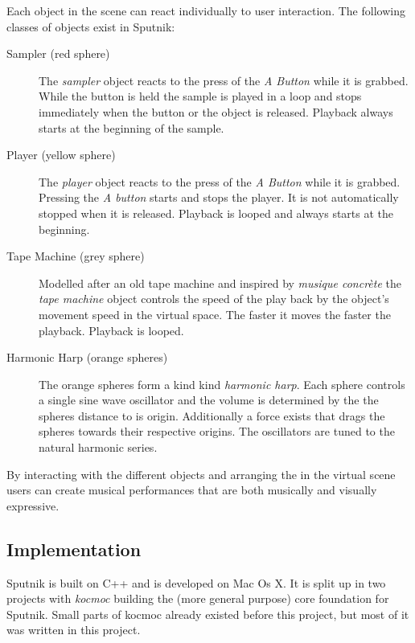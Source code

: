 \documentclass[10pt,a4paper]{scrartcl}
\begin{document}
Each object in the scene can react individually to user interaction. The following classes of objects exist in Sputnik:
\begin{description}
\item[Sampler (red sphere)] The \emph{sampler} object reacts to the press of the \emph{A Button} while it is grabbed. While the button is held the sample is played in a loop and stops immediately when the button or the object is released. Playback always starts at the beginning of the sample.

\item[Player (yellow sphere)] The \emph{player} object reacts to the press of the \emph{A Button} while it is grabbed. Pressing the \emph{A button} starts and stops the player. It is not automatically stopped when it is released. Playback is looped and always starts at the beginning.

\item[Tape Machine (grey sphere)] Modelled after an old tape machine and inspired by \emph{musique concrète} the \emph{tape machine} object controls the speed of the play back by the object's movement speed in the virtual space. The faster it moves the faster the playback. Playback is looped.

\item[Harmonic Harp (orange spheres)] The orange spheres form a kind kind \emph{harmonic harp}. Each sphere controls a single sine wave oscillator and the volume is determined by the the spheres distance to is origin. Additionally a force exists that drags the spheres towards their respective origins. The oscillators are tuned to the natural harmonic series.
\end{description}

By interacting with the different objects and arranging the in the virtual scene users can create musical performances that are both musically and visually expressive.




\subsection{Implementation}
Sputnik is built on C++ and is developed on Mac Os X. It is split up in two projects with \emph{kocmoc} building the (more general purpose) core foundation for Sputnik. Small parts of kocmoc already existed before this project, but most of it was written in this project.
\end{document}
